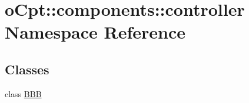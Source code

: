 \hypertarget{namespaceo_cpt_1_1components_1_1controller}{}\section{o\+Cpt\+:\+:components\+:\+:controller Namespace Reference}
\label{namespaceo_cpt_1_1components_1_1controller}
\subsection*{Classes}
\begin{DoxyCompactItemize}
\item 
class \hyperlink{classo_cpt_1_1components_1_1controller_1_1_b_b_b}{B\+BB}
\end{DoxyCompactItemize}
